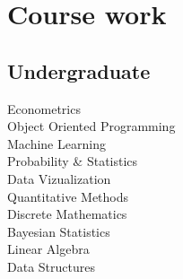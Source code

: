 \documentclass[letterpaper]{deedy-resume}
\begin{document}
\begin{minipage}[t]{0.31\textwidth}
\section{Course work}
\subsection{Undergraduate}
Econometrics \\
Object Oriented Programming \\
Machine Learning \\
Probability \& Statistics \\
Data Vizualization \\
Quantitative Methods \\
Discrete Mathematics \\
Bayesian Statistics \\
Linear Algebra \\
Data Structures 
\sectionspace 

\end{minipage} 
\hfill
%
%
\end{document}
